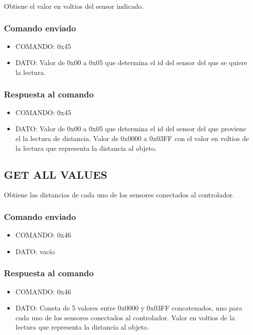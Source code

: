 \documentclass[a4paper,10pt]{article}
\begin{document}
Obtiene el valor en voltios del sensor indicado.

\subsubsection*{Comando enviado}

\begin{itemize}
	\item{COMANDO:} 0x45
	\item{DATO:} Valor de 0x00 a 0x05 que determina el id del sensor del que se quiere la lectura.
\end{itemize}

\subsubsection*{Respuesta al comando}

\begin{itemize}
	\item{COMANDO:} 0x45
	\item{DATO:} Valor de 0x00 a 0x05 que determina el id del sensor del que proviene el la lectura de distancia.
	Valor de 0x0000 a 0x03FF con el valor en voltios de la lectura que representa la distancia al objeto.
\end{itemize}

\subsection{GET ALL VALUES}
\label{get_all_values_us}

Obtiene las distancias de cada uno de los sensores conectados al controlador.

\subsubsection*{Comando enviado}

\begin{itemize}
	\item{COMANDO:} 0x46
	\item{DATO:} vac\'io
\end{itemize}

\subsubsection*{Respuesta al comando}

\begin{itemize}
	\item{COMANDO:} 0x46
	\item{DATO:} Consta de 5 valores entre 0x0000 y 0x03FF concatenados, uno para cada uno de los sensores conectados al controlador.
	Valor en voltios de la lectura que representa la distancia al objeto.
\end{itemize}
\end{document}
